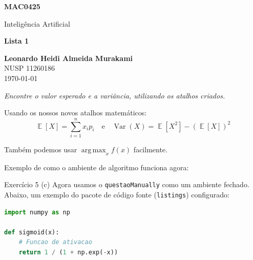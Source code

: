 \documentclass[a4paper,11pt]{article}
\DeclareMathOperator*{\argmax}{arg\,max}
\DeclareMathOperator{\E}{\mathbb{E}}
\DeclareMathOperator{\Var}{Var}
\newcommand{\CodigoDisciplina}{MAC0425}
\newcommand{\NomeDisciplina}{Inteligência Artificial}
\newcommand{\NumeroLista}{1}
\newcommand{\TituloListaExtra}{}
\newcommand{\NomeAluno}{Leonardo Heidi Almeida Murakami}
\newcommand{\NUSP}{11260186}
\newcommand{\DataEntrega}{\today}
\theoremstyle{definition}
\theoremstyle{plain}
\theoremstyle{remark}
\newenvironment{enunciado}
  {\par\noindent\color{IMEgray}\itshape}
  {\par\medskip}
\newcounter{questao}[section]
\newcommand{\makelistatitle}{%
  \thispagestyle{plain}
  \noindent
  \begin{minipage}[t]{0.70\linewidth}
    {\LARGE\bfseries\color{IMEblue}\CodigoDisciplina}\par\vspace{0.15em}
    {\large\color{IMEgray}\NomeDisciplina}\par\vspace{1.1em}
    {\Large\bfseries Lista \NumeroLista
      \ifdefempty{\TituloListaExtra}{}{ --- \TituloListaExtra}%
    }
  \end{minipage}\hfill
  \begin{minipage}[t]{0.28\linewidth}
    \raggedleft\small\color{IMEgray}
    \textbf{\NomeAluno}\\[0.25em]
    NUSP \NUSP\\[0.5em]
    \DataEntrega
  \end{minipage}
  \par\vspace{1.2em}
  \noindent{\color{IMEgray!35}\rule{\linewidth}{0.6pt}}
  \par\vspace{1em}
}
\begin{document}
\makelistatitle

\begin{exercicio}
  \begin{enunciado}
    Encontre o valor esperado e a variância, utilizando os atalhos criados.
  \end{enunciado}

  Usando os nossos novos atalhos matemáticos:
  \begin{equation*}
    \E[X] = \sum_{i=1}^{n} x_i p_i \quad \text{e} \quad \Var(X) = \E[X^2] - (\E[X])^2
  \end{equation*}
  
  Também podemos usar $\argmax_{x} f(x)$ facilmente.
\end{exercicio}

\begin{exercicio}[(Busca A*)]
  Exemplo de como o ambiente de algoritmo funciona agora:
  
  \begin{algorithm}[H]
    \caption{Busca A* Simplificada}
  \end{algorithm}
\end{exercicio}

\begin{questaoManually}{Exercício 5 (c)}
  Agora usamos o \texttt{questaoManually} como um ambiente fechado. Abaixo, um exemplo do pacote de código fonte (\texttt{listings}) configurado:

\begin{lstlisting}[language=Python]
import numpy as np

def sigmoid(x):
    # Funcao de ativacao
    return 1 / (1 + np.exp(-x))
\end{lstlisting}
\end{questaoManually}
\end{document}
